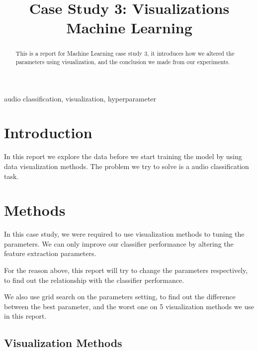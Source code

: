 \documentclass[conference]{IEEEtran}
\begin{document}
\title{Case Study 3: Visualizations\\
{\large Machine Learning}
}

\author{
}

\maketitle

\begin{abstract}
This is a report for Machine Learning case study 3, 
it introduces how we altered the parameters using visualization,
and the conclusion we made from our experiments.
\end{abstract}

\begin{IEEEkeywords}
audio classification, visualization, hyperparameter
\end{IEEEkeywords}

\section{Introduction}
In this report we explore the data before we start training the model by using data visualization methods.
The problem we try to solve is a audio classification task.

\section{Methods}
In this case study, we were required to use visualization methods 
to tuning the parameters. We can only improve our classifier performance 
by altering the feature extraction parameters.

For the reason above, this report will try to change the parameters respectively,
to find out the relationship with the classifier performance.

We also use grid search on the parameters setting, to find out the difference
between the best parameter, 
and the worst one on 5 visualization methods we use in this report.
\subsection{Visualization Methods}
\end{document}
